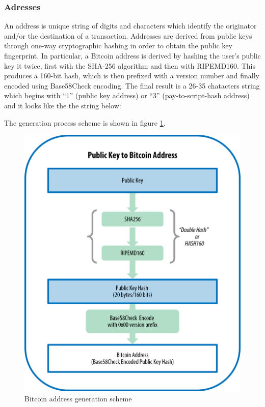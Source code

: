 \subsubsection{Adresses} An address is unique string of digits and characters
which identify the originator and/or the destination of a transaction. Addresses
are derived from public keys through one-way cryptographic hashing in order to
obtain the public key fingerprint. In particular, a Bitcoin address is derived
by hashing the user's public key it twice, first with the SHA-256 algorithm and
then with RIPEMD160. This produces a 160-bit hash, which is then prefixed with a
version number and finally encoded using Base58Check encoding. The final result
is a 26-35 chatacters string which begins with ``$1$'' (public key address) or
``$3$'' (pay-to-script-hash address) and it looks like the the string below:
\begin{center}  \end{center} The
generation process scheme is shown in figure \ref{fig:address-generation}.

\begin{figure}[!htb]
	\centering
	\includegraphics[width=0.85\linewidth]{img/address-generation.png}
	\caption{Bitcoin address generation scheme}
	\label{fig:address-generation}
\end{figure}


